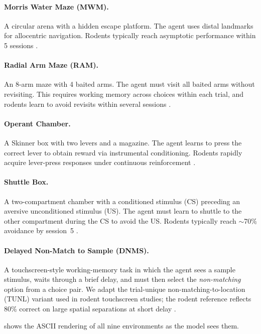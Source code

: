 \documentclass[letterpaper]{article}
\begin{document}
\paragraph{Morris Water Maze (MWM).}
A circular arena with a hidden escape platform. The agent uses distal landmarks for allocentric navigation. Rodents typically reach asymptotic performance within 5 sessions \citep{vorhees2006morris}.

\paragraph{Radial Arm Maze (RAM).}
An 8-arm maze with 4 baited arms. The agent must visit all baited arms without revisiting. This requires working memory across choices within each trial, and rodents learn to avoid revisits within several sessions \citep{olton1976spatial}.

\paragraph{Operant Chamber.}
A Skinner box with two levers and a magazine. The agent learns to press the correct lever to obtain reward via instrumental conditioning. Rodents rapidly acquire lever-press responses under continuous reinforcement \citep{skinner1938behavior}.

\paragraph{Shuttle Box.}
A two-compartment chamber with a conditioned stimulus (CS) preceding an aversive unconditioned stimulus (US). The agent must learn to shuttle to the other compartment during the CS to avoid the US. Rodents typically reach $\sim$70\% avoidance by session~5 \citep{chacon2016shuttle}.

\paragraph{Delayed Non-Match to Sample (DNMS).}
A touchscreen-style working-memory task in which the agent sees a sample stimulus, waits through a brief delay, and must then select the \emph{non-matching} option from a choice pair. We adapt the trial-unique non-matching-to-location (TUNL) variant used in rodent touchscreen studies; the rodent reference reflects 80\% correct on large spatial separations at short delay \citep{horner2013touchscreen}.

 shows the ASCII rendering of all nine environments as the model sees them.
\end{document}
